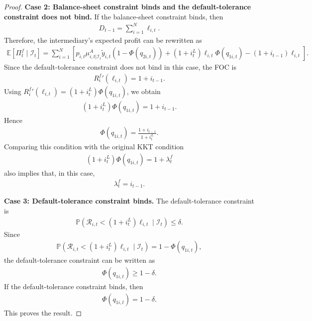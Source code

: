 \documentclass[12pt]{article}
\numberwithin{equation}{section}
\begin{document}
\begin{appendix}
\begin{proof}
    \noindent\textbf{Case 2: Balance-sheet constraint binds and the default-tolerance constraint does not bind.}
    If the balance-sheet constraint binds, then
    \begin{align*}
        D_{t-1}
        =
        \sum_{i=1}^N \ell_{i,t}.
    \end{align*}
    Therefore, the intermediary's expected profit can be rewritten as
    \begin{align*}
        \mathbb{E} \left[\Pi^f_t \mid \mathcal{I}_t \right]
        =
        \sum_{i=1}^N
        \left[
        p_{i,t}\mu^A_{i, t|\mathcal{I}_t}\tilde{y}_{i,t}
        \left(1-\Phi(q_{2i,t})\right)
        +
        (1+i^L_t)\ell_{i,t}\Phi(q_{1i,t})
        -
        (1+i_{t-1})\ell_{i,t}
        \right].
    \end{align*}
    Since the default-tolerance constraint does not bind in this case, the FOC is
    \begin{align*}
        {R^f_i}'(\ell_{i,t})
        =
        1+i_{t-1}.
    \end{align*}
    Using ${R^f_i}'(\ell_{i,t})=(1+i^L_t)\Phi(q_{1i,t})$, we obtain
    \begin{align*}
        (1+i^L_t)\Phi(q_{1i,t})
        =
        1+i_{t-1}.
    \end{align*}
    Hence
    \begin{align*}
        \Phi(q_{1i,t})
        =
        \frac{1+i_{t-1}}{1+i^L_t}.
    \end{align*}
    Comparing this condition with the original KKT condition
    \begin{align*}
        (1+i^L_t)\Phi(q_{1i,t})
        =
        1+\lambda^f_t
    \end{align*}
    also implies that, in this case,
    \begin{align*}
        \lambda^f_t=i_{t-1}.
    \end{align*}

    \noindent\textbf{Case 3: Default-tolerance constraint binds.}
    The default-tolerance constraint is
    \begin{align*}
        \mathbb{P}
        \left(
        \mathcal{R}_{i,t}<(1+i^L_t)\ell_{i,t}
        \mid \mathcal{I}_t\right)
        \leq \delta.
    \end{align*}
    Since
    \begin{align*}
        \mathbb{P}
        \left(
        \mathcal{R}_{i,t}<(1+i^L_t)\ell_{i,t}
        \mid \mathcal{I}_t\right)
        =
        1-\Phi(q_{1i,t}),
    \end{align*}
    the default-tolerance constraint can be written as
    \begin{align*}
        \Phi(q_{1i,t})\geq 1-\delta.
    \end{align*}
    If the default-tolerance constraint binds, then
    \begin{align*}
        \Phi(q_{1i,t})
        =
        1-\delta.
    \end{align*}
    This proves the result.
\end{proof}


\end{appendix}
\end{document}
